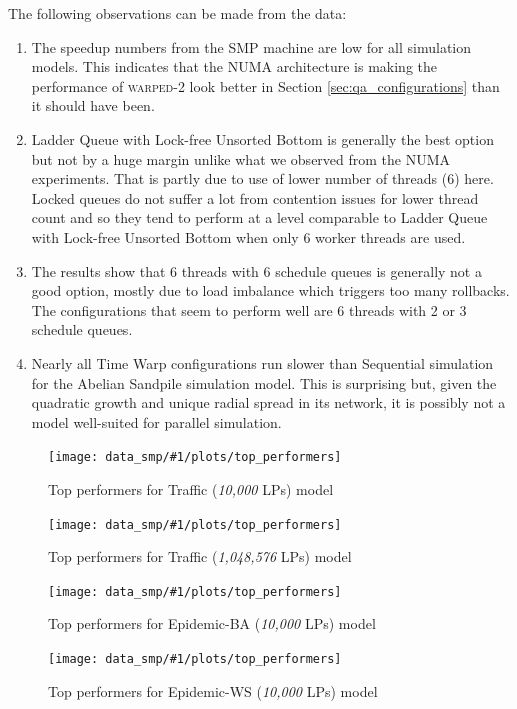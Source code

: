\documentclass[11pt]{book}
\newcommand{\plotOverallSMP}[3]{
\begin{figure}
  \centering
  \texttt{[image: data\_smp/\#1/plots/top\_performers]}
  \caption{#2}\label{#3}
\end{figure}
}
\begin{document}
The following observations can be made from the data:

\begin{enumerate}
  \item The speedup numbers from the SMP machine are low for all simulation models. This indicates that
        the NUMA architecture is making the performance of \textsc{warped-2} look better in Section
        \ref{sec:qa_configurations} than it should have been.

  \item Ladder Queue with Lock-free Unsorted Bottom is generally the best option but not by a huge margin
        unlike what we observed from the NUMA experiments. That is partly due to use of lower number of
        threads (6) here. Locked queues do not suffer a lot from contention issues for lower thread count
        and so they tend to perform at a level comparable to Ladder Queue with Lock-free Unsorted Bottom
        when only 6 worker threads are used.

  \item The results show that 6 threads with 6 schedule queues is generally not a good option, mostly due
        to load imbalance which triggers too many rollbacks. The configurations that seem to perform well
        are 6 threads with 2 or 3 schedule queues. 

  \item Nearly all Time Warp configurations run slower than Sequential simulation for the Abelian Sandpile
        simulation model. This is surprising but, given the quadratic growth and unique radial spread in
        its network, it is possibly not a model well-suited for parallel simulation.
\end{enumerate}

\plotOverallSMP{traffic_10k}
               {Top performers for Traffic (\emph{10,000} LPs) model}
               {plot:traffic_10k:consolidated_smp}

\plotOverallSMP{traffic_1m}
               {Top performers for Traffic (\emph{1,048,576} LPs) model}
               {plot:traffic_1m:consolidated_smp}

\plotOverallSMP{epidemic_10k_ba}
               {Top performers for Epidemic-BA (\emph{10,000} LPs) model}
               {plot:epidemic_10k_ba:consolidated_smp}

\plotOverallSMP{epidemic_10k_ws}
               {Top performers for Epidemic-WS (\emph{10,000} LPs) model}
               {plot:epidemic_10k_ws:consolidated_smp}
\end{document}
